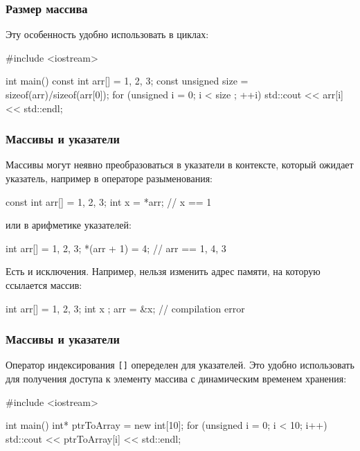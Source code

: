 \documentclass[compress, 8pt]{beamer}
\begin{document}
\begin{frame}[fragile]

    \frametitle{Размер массива}

    Эту особенность удобно использовать в циклах:

    \begin{myinplacelisting}[minted language=cpp]
#include <iostream>

int main() {
    const int arr[] = {1, 2, 3};
    const unsigned size
        = sizeof(arr)/sizeof(arr[0]);
    for (unsigned i = 0; i < size ; ++i) {
        std::cout << arr[i] << std::endl;
    }
}
    \end{myinplacelisting}

\end{frame}

\begin{frame}[fragile]

    \frametitle{Массивы и указатели}

    Массивы могут неявно преобразоваться в указатели в контексте,
    который ожидает указатель, например в операторе разыменования:

    \begin{myinplacelisting}[minted language=cpp]
const int arr[] = {1, 2, 3};
int x = *arr; // x == 1
    \end{myinplacelisting}

    или в арифметике указателей:

    \begin{myinplacelisting}[minted language=cpp]
int arr[] = {1, 2, 3};
*(arr + 1) = 4; // arr == {1, 4, 3}
    \end{myinplacelisting}

    Есть и исключения.
    Например, нельзя изменить адрес памяти, на которую ссылается массив:

    \begin{myinplacelisting}[minted language=cpp]
int arr[] = {1, 2, 3};
int x {};
arr = &x; // compilation error
    \end{myinplacelisting}

\end{frame}

\begin{frame}[fragile]

    \frametitle{Массивы и указатели}

    Оператор индексирования \verb|[]| опеределен для указателей.
    Это удобно использовать для получения доступа к элементу массива с
    динамическим временем хранения:

    \begin{myinplacelisting}[minted language=cpp]
#include <iostream>

int main() {
    int* ptrToArray = new int[10];
    for (unsigned i = 0; i < 10; i++) {
        std::cout << ptrToArray[i] << std::endl;
    }
}
    \end{myinplacelisting}

\end{frame}
\end{document}
